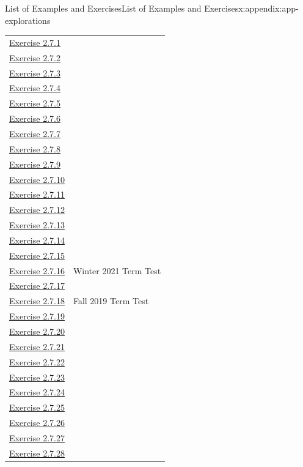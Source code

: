 \documentclass[oneside,10pt,]{book}
\numberwithin{equation}{section}
\begin{document}
\begin{appendixptx}{List of Examples and Exercises}{}{List of Examples and Exercises}{}{}{x:appendix:app-explorations}
\begin{longtable}[l]{ll}
\hyperlink{g:exercise:id530568}{Exercise 2.7.1}& \\
\hyperlink{g:exercise:id530603}{Exercise 2.7.2}& \\
\hyperlink{g:exercise:id530623}{Exercise 2.7.3}& \\
\hyperlink{g:exercise:id530629}{Exercise 2.7.4}& \\
\hyperlink{g:exercise:id530670}{Exercise 2.7.5}& \\
\hyperlink{g:exercise:id530678}{Exercise 2.7.6}& \\
\hyperlink{g:exercise:id530717}{Exercise 2.7.7}& \\
\hyperlink{g:exercise:id530778}{Exercise 2.7.8}& \\
\hyperlink{g:exercise:id530856}{Exercise 2.7.9}& \\
\hyperlink{g:exercise:id530915}{Exercise 2.7.10}& \\
\hyperlink{g:exercise:id530936}{Exercise 2.7.11}& \\
\hyperlink{x:exercise:divex-3x3-grid}{Exercise 2.7.12}& \\
\hyperlink{g:exercise:id531052}{Exercise 2.7.13}& \\
\hyperlink{g:exercise:id531090}{Exercise 2.7.14}& \\
\hyperlink{g:exercise:id531120}{Exercise 2.7.15}& \\
\hyperlink{g:exercise:id531158}{Exercise 2.7.16}& Winter 2021 Term Test\\
\hyperlink{g:exercise:id531234}{Exercise 2.7.17}& \\
\hyperlink{g:exercise:id531202}{Exercise 2.7.18}& Fall 2019 Term Test\\
\hyperlink{g:exercise:id531294}{Exercise 2.7.19}& \\
\hyperlink{g:exercise:id531325}{Exercise 2.7.20}& \\
\hyperlink{g:exercise:id531342}{Exercise 2.7.21}& \\
\hyperlink{g:exercise:id531359}{Exercise 2.7.22}& \\
\hyperlink{g:exercise:id531394}{Exercise 2.7.23}& \\
\hyperlink{g:exercise:id531403}{Exercise 2.7.24}& \\
\hyperlink{g:exercise:id531450}{Exercise 2.7.25}& \\
\hyperlink{g:exercise:id531442}{Exercise 2.7.26}& \\
\hyperlink{g:exercise:id531594}{Exercise 2.7.27}& \\
\hyperlink{g:exercise:id531616}{Exercise 2.7.28}& \\

\end{longtable}
\end{appendixptx}
\end{document}
